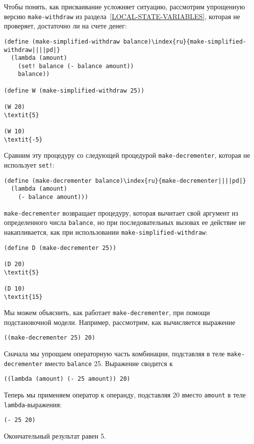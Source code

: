   Чтобы понять, как присваивание усложняет ситуацию,
рассмотрим упрощенную версию {\tt make-withdraw} из
раздела~\ref{LOCAL-STATE-VARIABLES}, которая не проверяет,
достаточно ли на счете денег:

\begin{Verbatim}[fontsize=\small]
(define (make-simplified-withdraw balance)\index{ru}{make-simplified-withdraw||||pd|}
  (lambda (amount)
    (set! balance (- balance amount))
    balance))

(define W (make-simplified-withdraw 25))

(W 20)
\textit{5}

(W 10)
\textit{-5}
\end{Verbatim}
Сравним эту процедуру со следующей процедурой
{\tt make-decrementer}, которая не использует
{\tt set!}:

\begin{Verbatim}[fontsize=\small]
(define (make-decrementer balance)\index{ru}{make-decrementer||||pd|}
  (lambda (amount)
    (- balance amount)))
\end{Verbatim}
{\tt make-decrementer} возвращает процедуру, которая вычитает
свой аргумент из определенного числа {\tt balance}, но при
последовательных вызовах ее действие не накапливается, как при
использовании {\tt make\--simpli\-fied\--with\-draw}:

\begin{Verbatim}[fontsize=\small]
(define D (make-decrementer 25))

(D 20)
\textit{5}

(D 10)
\textit{15}
\end{Verbatim}
Мы можем объяснить, как работает {\tt make-decrementer}, при
помощи подстановочной модели.  Например, рассмотрим, как вычисляется
выражение

\begin{Verbatim}[fontsize=\small]
((make-decrementer 25) 20)
\end{Verbatim}
Сначала мы упрощаем операторную часть комбинации, подставляя в теле
{\tt make-decrementer} вместо {\tt balance} 25.
Выражение сводится к

\begin{Verbatim}[fontsize=\small]
((lambda (amount) (- 25 amount)) 20)
\end{Verbatim}
Теперь мы применяем оператор к операнду, подставляя 20 вместо
{\tt amount} в теле {\tt lambda}-выра\-же\-ния:

\begin{Verbatim}[fontsize=\small]
(- 25 20)
\end{Verbatim}
Окончательный результат равен 5.

